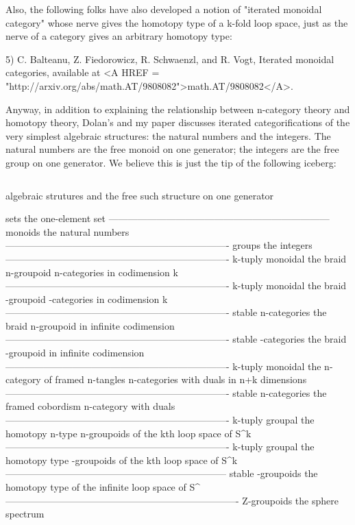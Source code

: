 {Also, the following folks have also developed a notion of "iterated
monoidal category" whose nerve gives the homotopy type of a k-fold
loop space, just as the nerve of a category gives an arbitrary
homotopy type:

5) C. Balteanu, Z. Fiedorowicz, R. Schwaenzl, and R. Vogt, Iterated
monoidal categories, available at <A HREF = 
"http://arxiv.org/abs/math.AT/9808082">math.AT/9808082</A>.

Anyway, in addition to explaining the relationship between n-category
theory and homotopy theory, Dolan's and my paper discusses iterated
categorifications of the very simplest algebraic structures: the
natural numbers and the integers.  The natural numbers are the free
monoid on one generator; the integers are the free group on one
generator.  We believe this is just the tip of the following iceberg:


$$


  algebraic strutures and the free such structure on one generator

    sets                               the one-element set
---------------------------------------------------------------------
   monoids                             the natural numbers
----------------------------------------------------------------------
    groups                                the integers
----------------------------------------------------------------------
 k-tuply monoidal                      the braid n-groupoid 
   n-categories                           in codimension k
----------------------------------------------------------------------
  k-tuply monoidal                    the braid \omega -groupoid 
  \omega -categories                        in codimension k
----------------------------------------------------------------------
 stable n-categories                  the braid n-groupoid 
                                     in infinite codimension
----------------------------------------------------------------------
stable \omega -categories               the braid \omega -groupoid 
                                      in infinite codimension
----------------------------------------------------------------------
  k-tuply monoidal                 the n-category of framed n-tangles
n-categories with duals                  in n+k dimensions
----------------------------------------------------------------------
 stable n-categories                the framed cobordism n-category
    with duals
----------------------------------------------------------------------
 k-tuply groupal                         the homotopy n-type 
  n-groupoids                        of the kth loop space of S^{k}
----------------------------------------------------------------------
 k-tuply groupal                          the homotopy type  
 \omega -groupoids                    of the kth loop space of S^{k}
---------------------------------------------------------------------
stable \omega -groupoids                   the homotopy type 
                                   of the infinite loop space of S^{\infty }
-------------------------------------------------------------------------
   Z-groupoids                          the sphere spectrum       

}
